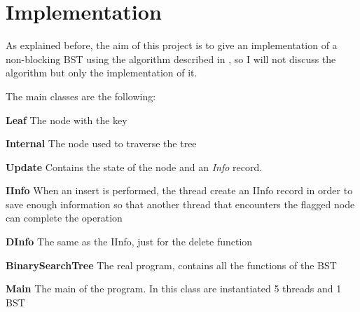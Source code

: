 \documentclass[a4paper]{article}
\begin{document}

\section{Implementation} %
\label{sec:implementation}
As explained before, the aim of this project is to give an implementation of a non-blocking \ac{BST} using the algorithm described in \cite{algorithm}, so I will not discuss the algorithm but only the implementation of it.

\noindent
The main classes are the following:
\begin{compactitem}
  \item \textbf{Leaf} The node with the key
  \item \textbf{Internal} The node used to traverse the tree
  \item \textbf{Update} Contains the state of the node and an \emph{Info} record.
  \item \textbf{IInfo} When an insert is performed, the thread create an IInfo record in order to save enough information so that another thread that encounters the flagged node can complete the operation
  \item \textbf{DInfo} The same as the IInfo, just for the delete function
  \item \textbf{BinarySearchTree} The real program, contains all the functions of the \ac{BST}
  \item \textbf{Main} The main of the program. In this class are instantiated 5 threads and 1 \ac{BST}
\end{compactitem}
\end{document}
